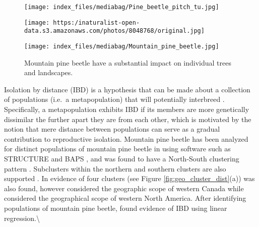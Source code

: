 \documentclass[
  letterpaper,
  DIV=11,
  numbers=noendperiod]{scrreprt}
\begin{document}
\begin{figure}

\begin{minipage}{0.50\linewidth}

\texttt{[image: index\_files/mediabag/Pine\_beetle\_pitch\_tu.jpg]}

\end{minipage}%
%
\begin{minipage}{0.50\linewidth}

\texttt{[image: https:/inaturalist-open-data.s3.amazonaws.com/photos/8048768/original.jpg]}

\end{minipage}%
\newline
\begin{minipage}{0.50\linewidth}

\texttt{[image: index\_files/mediabag/Mountain\_pine\_beetle.jpg]}

\end{minipage}%

\caption{\label{fig-pine-beetle}Mountain pine beetle have a substantial
impact on individual trees and landscapes.}

\end{figure}%

Isolation by distance (IBD) is a hypothesis that can be made about a
collection of populations (i.e.~a metapopulation) that will potentially
interbreed \cite{Wright1943}. Specifically, a metapopulation exhibits
IBD if its members are more genetically dissimilar the further apart
they are from each other, which is motivated by the notion that mere
distance between populations can serve as a gradual contribution to
reproductive isolation. Mountain pine beetle has been analyzed for
distinct populations of mountain pine beetle in
\cite{booneunpublished, samarasekera2012} using software such as
STRUCTURE \cite{Pritchard2000} and BAPS \cite{Corander2003}, and was
found to have a North-South clustering pattern \cite{samarasekera2012}.
Subclusters within the northern and southern clusters are also supported
\cite{samarasekera2012}. In \cite{booneunpublished} evidence of four
clusters (see Figure \ref{fig:geo_cluster_dist}(a)) was also found,
however \cite{samarasekera2012} considered the geographic scope of
western Canada while \cite{booneunpublished} considered the geographical
scope of western North America. After identifying populations of
mountain pine beetle, \cite{samarasekera2012} found evidence of IBD
using linear regression.\textbackslash{}
\end{document}
